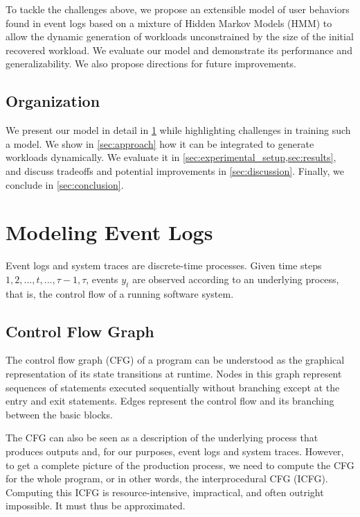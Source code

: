 To tackle the challenges above, we propose an extensible model of user behaviors found in event logs based on a mixture of Hidden Markov Models (HMM) to allow the dynamic generation of workloads unconstrained by the size of the initial recovered workload. We evaluate our model and demonstrate its performance and generalizability. We also propose directions for future improvements.

\subsection{Organization}

We present our model in detail in \cref{sec:modeling_processes} while highlighting challenges in training such a model. We show in \cref{sec:approach} how it can be integrated to generate workloads dynamically. We evaluate it in \cref{sec:experimental_setup,sec:results}, and discuss tradeoffs and potential improvements in \cref{sec:discussion}. Finally, we conclude in \cref{sec:conclusion}.

\section{Modeling Event Logs}\label{sec:modeling_processes}

Event logs and system traces are discrete-time processes. Given time steps \(1, 2, ..., t, ..., \tau - 1, \tau\),  events \(y_t\) are observed according to an underlying process, that is, the control flow of a running software system.

\subsection{Control Flow Graph}

The control flow graph (CFG) of a program can be understood as the graphical representation of its state transitions at runtime. Nodes in this graph represent sequences of statements executed sequentially without branching except at the entry and exit statements. Edges represent the control flow and its branching between the basic blocks.

The CFG can also be seen as a description of the underlying process that produces outputs and, for our purposes, event logs and system traces. However, to get a complete picture of the production process, we need to compute the CFG for the whole program, or in other words, the interprocedural CFG (ICFG). Computing this ICFG is resource-intensive, impractical, and often outright impossible. It must thus be approximated\cite{Zhao2023-nh}.

